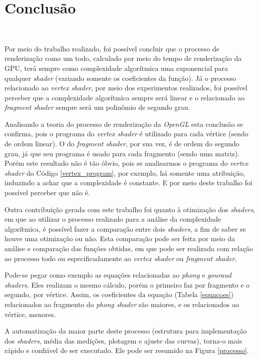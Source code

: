 \chapter[Conclusao]{Conclusão}\

	Por meio do trabalho realizado, foi possível concluir que o processo de renderização como um todo, calculado por meio do tempo de renderização da GPU, terá sempre como complexidade algorítmica uma exponencial para qualquer \textit{shader} (variando somente os coeficientes da função).  Já o processo relacionado ao \textit{vertex shader}, por meio dos experimentos realizados, foi possível perceber que a complexidade algorítmica sempre será linear e o relacionado ao \textit{fragment shader} sempre será um polinômio de segundo grau.

	Analisando a teoria do processo de renderização da \textit{OpenGL} esta conclusão se confirma, pois o programa do \textit{vertex shader} é utilizado para cada vértice (sendo de ordem linear).  O do \textit{fragment shader}, por sua vez, é de ordem do segundo grau, já que seu programa é usado para cada fragmento (sendo uma matriz). Porém este resultado não é tão óbvio, pois se analisarmos o programa do \textit{vertex shader} do Código \ref{vertex_program}, por exemplo, há somente uma atribuição, induzindo a achar que a complexidade é constante. E por meio deste trabalho foi possível perceber que não é.

	 
	
	Outra contribuição gerada com este trabalho foi quanto à otimização dos \textit{shaders}, em que ao utilizar o processo realizado para a análise da complexidade algorítmica, é possível fazer a comparação entre dois \textit{shaders}, a fim de saber se houve uma otimização ou não. Esta comparação pode ser feita por meio da análise e comparação das funções obtidas, em que pode ser realizada com relação ao processo todo ou especificadamente ao \textit{vertex shader} ou \textit{fragment shader}.

	Pode-se pegar como exemplo as equações relacionadas ao \textit{phong} e \textit{gouraud shaders}. Eles realizam o mesmo cálculo, porém o primeiro faz por fragmento e o segundo, por vértice.  Assim, os coeficientes da equação (Tabela \ref{equacoes}) relacionados ao fragmento do \textit{phong shader} são maiores, e os relacionados ao vértice, menores. 

	A automatização da maior parte deste processo (estrutura para implementação dos \textit{shaders}, média das medições, plotagem e ajuste das curvas), torna-o mais rápido e confiável de ser executado. Ele pode ser resumido na Figura \ref{processo}.

